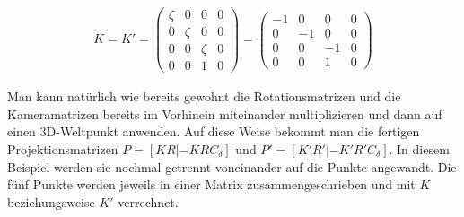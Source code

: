 \begin{gather}
	K =	K'=
	\begin{pmatrix}
		\zeta&0&0&0\\
		0&\zeta&0&0\\
		0&0&\zeta&0\\
		0&0&1&0
	\end{pmatrix}=
	\begin{pmatrix}
		-1&0&0&0\\
		0&-1&0&0\\
		0&0&-1&0\\
		0&0&1&0
	\end{pmatrix}
\end{gather}

Man kann natürlich wie bereits gewohnt die Rotationsmatrizen und die Kameramatrizen bereits im Vorhinein miteinander multiplizieren und dann auf einen 3D-Weltpunkt anwenden. Auf diese Weise bekommt man die fertigen Projektionsmatrizen  $P=[KR|-KRC_\delta]$ und $P'=[K'R'|-K'R'C_\delta]$. In diesem Beispiel werden sie nochmal getrennt voneinander auf die Punkte angewandt. Die fünf Punkte werden jeweils in einer Matrix zusammengeschrieben und mit $K$ beziehungsweise $K'$ verrechnet. 


